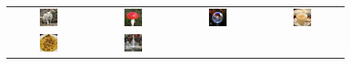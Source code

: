 \begin{figure}[htbp]
\centering
\setlength{\tabcolsep}{1pt}
\begin{tabular}{cccc}
\includegraphics[width=0.24\textwidth]{images/samples1/512wolf0.jpg} & 
\includegraphics[width=0.24\textwidth]{images/samples1/512mushroom0.jpg} &
\includegraphics[width=0.24\textwidth]{images/samples1/512bubble0.jpg} & 
\includegraphics[width=0.24\textwidth]{images/samples1/mocha0.jpg} \\
\includegraphics[width=0.24\textwidth]{images/samples1/512pasta0.jpg} & 
\includegraphics[width=0.24\textwidth]{images/samples1/512fountain0.jpg} &

\end{tabular}
\end{figure}
